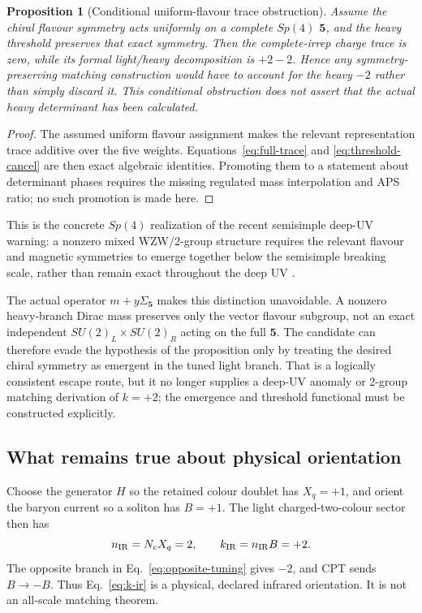 \documentclass[11pt]{article}
\newtheorem{proposition}[theorem]{Proposition}
\theoremstyle{definition}
\theoremstyle{remark}
\begin{document}
\begin{proposition}[Conditional uniform-flavour trace obstruction]
Assume the chiral flavour symmetry acts uniformly on a complete
\(Sp(4)\) \(\bm5\), and the heavy threshold preserves that exact symmetry.
Then the complete-irrep charge trace is zero, while its formal light/heavy
decomposition is \(+2-2\).  Hence any symmetry-preserving matching
construction would have to account for the heavy \(-2\) rather than simply
discard it.  This conditional obstruction does not assert that the actual
heavy determinant has been calculated.
\end{proposition}
\begin{proof}
The assumed uniform flavour assignment makes the relevant representation
trace additive over the five weights.  Equations~\eqref{eq:full-trace} and
\eqref{eq:threshold-cancel} are then exact algebraic identities.  Promoting
them to a statement about determinant phases requires the missing regulated
mass interpolation and APS ratio; no such promotion is made here.
\end{proof}

This is the concrete \(Sp(4)\) realization of the recent semisimple
deep-UV warning: a nonzero mixed WZW/2-group structure requires the
relevant flavour and magnetic symmetries to emerge together below the
semisimple breaking scale, rather than remain exact throughout the deep UV
\cite{DavighiLohitsiri2024}.

The actual operator \(m+y\widehat\Sigma_{\bm5}\) makes this distinction
unavoidable.  A nonzero heavy-branch Dirac mass preserves only the vector
flavour subgroup, not an exact independent
\(SU(2)_L\times SU(2)_R\) acting on the full \(\bm5\).  The candidate can
therefore evade the hypothesis of the proposition only by treating the desired
chiral symmetry as emergent in the tuned light branch.  That is a logically
consistent escape route, but it no longer supplies a deep-UV anomaly or
2-group matching derivation of \(k=+2\); the emergence and threshold
functional must be constructed explicitly.

\subsection{What remains true about physical orientation}

Choose the generator \(H\) so the retained colour doublet has
\(X_q=+1\), and orient the baryon current so a soliton has \(B=+1\).  The
light charged-two-colour sector then has
\begin{equation}
 n_{\rm IR}=N_cX_q=2,
 \qquad
 k_{\rm IR}=n_{\rm IR}B=+2.
 \label{eq:k-ir}
\end{equation}
The opposite branch in Eq.~\eqref{eq:opposite-tuning} gives \(-2\), and
CPT sends \(B\to-B\).  Thus Eq.~\eqref{eq:k-ir} is a physical, declared
infrared orientation.  It is not an all-scale matching theorem.
\end{document}

